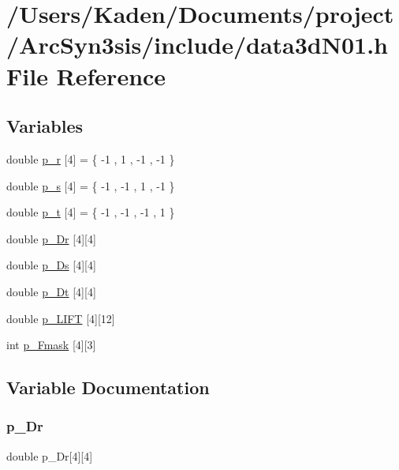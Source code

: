 \hypertarget{a00479}{}\section{/\+Users/\+Kaden/\+Documents/project/\+Arc\+Syn3sis/include/data3d\+N01.h File Reference}
\label{a00479}
\subsection*{Variables}
\begin{DoxyCompactItemize}
\item 
double \hyperlink{a00479_a49c3e9deef3ce181426dc3c9d2b6a8e0}{p\+\_\+r} \mbox{[}4\mbox{]} = \{ -\/1 , 1 , -\/1 , -\/1 \}
\item 
double \hyperlink{a00479_a0c6af4dee079e9dafe50b5621455a84c}{p\+\_\+s} \mbox{[}4\mbox{]} = \{ -\/1 , -\/1 , 1 , -\/1 \}
\item 
double \hyperlink{a00479_ab440cff25954330425bb1d1308bb8461}{p\+\_\+t} \mbox{[}4\mbox{]} = \{ -\/1 , -\/1 , -\/1 , 1 \}
\item 
double \hyperlink{a00479_a084ab3cf3655e94a657f00c6febe0e00}{p\+\_\+\+Dr} \mbox{[}4\mbox{]}\mbox{[}4\mbox{]}
\item 
double \hyperlink{a00479_a52b07158f0aaadb54b5abf96535ffd15}{p\+\_\+\+Ds} \mbox{[}4\mbox{]}\mbox{[}4\mbox{]}
\item 
double \hyperlink{a00479_a2651c6cf8d21a2418b2ea45b2d5db6e7}{p\+\_\+\+Dt} \mbox{[}4\mbox{]}\mbox{[}4\mbox{]}
\item 
double \hyperlink{a00479_a90a883d002d6c861ad00cd673d42c829}{p\+\_\+\+L\+I\+FT} \mbox{[}4\mbox{]}\mbox{[}12\mbox{]}
\item 
int \hyperlink{a00479_ad164ae44b1bba9ddbd14434ae4ecb671}{p\+\_\+\+Fmask} \mbox{[}4\mbox{]}\mbox{[}3\mbox{]}
\end{DoxyCompactItemize}


\subsection{Variable Documentation}
\mbox{\label{a00479_a084ab3cf3655e94a657f00c6febe0e00}} 
\subsubsection{\texorpdfstring{p\+\_\+\+Dr}{p\_Dr}}
{\footnotesize\ttfamily double p\+\_\+\+Dr\mbox{[}4\mbox{]}\mbox{[}4\mbox{]}}

